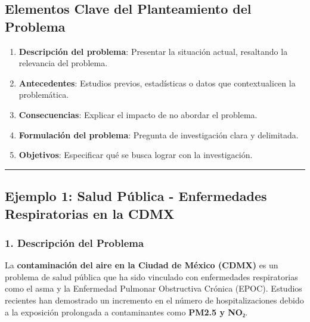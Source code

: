 \documentclass[
  letterpaper,
  DIV=11,
  numbers=noendperiod]{scrartcl}
\providecommand{\tightlist}{%
  \setlength{\itemsep}{0pt}\setlength{\parskip}{0pt}}
\begin{document}
\subsection{Elementos Clave del Planteamiento del
Problema}\label{elementos-clave-del-planteamiento-del-problema}

\begin{enumerate}
\def\labelenumi{\arabic{enumi}.}
\tightlist
\item
  \textbf{Descripción del problema}: Presentar la situación actual,
  resaltando la relevancia del problema.\\
\item
  \textbf{Antecedentes}: Estudios previos, estadísticas o datos que
  contextualicen la problemática.\\
\item
  \textbf{Consecuencias}: Explicar el impacto de no abordar el
  problema.\\
\item
  \textbf{Formulación del problema}: Pregunta de investigación clara y
  delimitada.\\
\item
  \textbf{Objetivos}: Especificar qué se busca lograr con la
  investigación.
\end{enumerate}

\begin{center}\rule{0.5\linewidth}{0.5pt}\end{center}

\subsection{\texorpdfstring{Ejemplo 1: \textbf{Salud Pública -
Enfermedades Respiratorias en la
CDMX}}{Ejemplo 1: Salud Pública - Enfermedades Respiratorias en la CDMX}}\label{ejemplo-1-salud-puxfablica---enfermedades-respiratorias-en-la-cdmx}

\subsubsection{\texorpdfstring{\textbf{1. Descripción del
Problema}}{1. Descripción del Problema}}\label{descripciuxf3n-del-problema}

La \textbf{contaminación del aire en la Ciudad de México (CDMX)} es un
problema de salud pública que ha sido vinculado con enfermedades
respiratorias como el asma y la Enfermedad Pulmonar Obstructiva Crónica
(EPOC). Estudios recientes han demostrado un incremento en el número de
hospitalizaciones debido a la exposición prolongada a contaminantes como
\textbf{PM2.5 y NO₂}.
\end{document}
